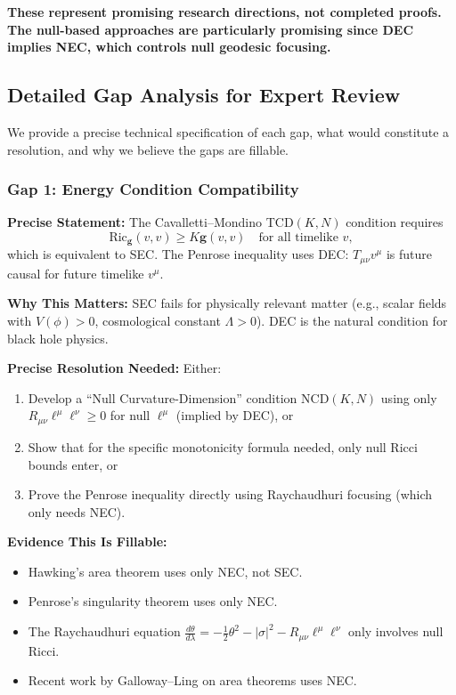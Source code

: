 \textbf{These represent promising research directions, not completed proofs. The null-based approaches are particularly promising since DEC implies NEC, which controls null geodesic focusing.}

\subsection{Detailed Gap Analysis for Expert Review}\label{subsec:DetailedGaps}

We provide a precise technical specification of each gap, what would constitute a resolution, and why we believe the gaps are fillable.

\subsubsection{Gap 1: Energy Condition Compatibility}

\textbf{Precise Statement:} The Cavalletti--Mondino TCD$(K,N)$ condition \cite{cavallettimondino2020} requires
\begin{equation}
    \mathrm{Ric}_{\mathbf{g}}(v,v) \geq K \mathbf{g}(v,v) \quad \text{for all timelike } v,
\end{equation}
which is equivalent to SEC. The Penrose inequality uses DEC: $T_{\mu\nu}v^\mu$ is future causal for future timelike $v^\mu$.

\textbf{Why This Matters:} SEC fails for physically relevant matter (e.g., scalar fields with $V(\phi) > 0$, cosmological constant $\Lambda > 0$). DEC is the natural condition for black hole physics.

\textbf{Precise Resolution Needed:} Either:
\begin{enumerate}
    \item[(a)] Develop a ``Null Curvature-Dimension'' condition NCD$(K,N)$ using only $R_{\mu\nu}\ell^\mu\ell^\nu \geq 0$ for null $\ell^\mu$ (implied by DEC), or
    \item[(b)] Show that for the specific monotonicity formula needed, only null Ricci bounds enter, or
    \item[(c)] Prove the Penrose inequality directly using Raychaudhuri focusing (which only needs NEC).
\end{enumerate}

\textbf{Evidence This Is Fillable:}
\begin{itemize}
    \item Hawking's area theorem uses only NEC, not SEC.
    \item Penrose's singularity theorem uses only NEC.
    \item The Raychaudhuri equation $\frac{d\theta}{d\lambda} = -\frac{1}{2}\theta^2 - |\sigma|^2 - R_{\mu\nu}\ell^\mu\ell^\nu$ only involves null Ricci.
    \item Recent work by Galloway--Ling \cite{gallowayling2017} on area theorems uses NEC.
\end{itemize}

